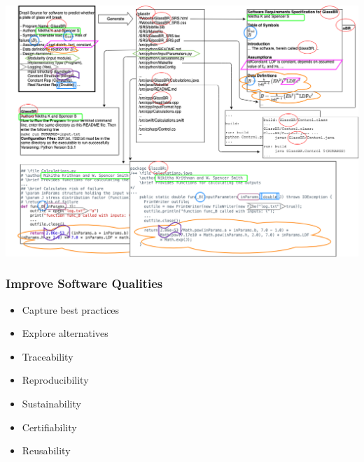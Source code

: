 \documentclass{beamer}
\begin{document}

\begin{frame}

\includegraphics[width=1.0\textwidth]{../figures/DrasilSupportsChange.png}

\end{frame}


\begin{frame}

\frametitle{Improve Software Qualities}

\begin{itemize}
\item Capture best practices
\item Explore alternatives  
\item Traceability
\item Reproducibility
\item Sustainability  
\item Certifiability
\item Reusability
\end{itemize}

\end{frame}

\end{document}
